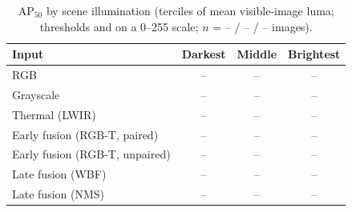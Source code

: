 \begin{table}[t]\centering\caption{AP$_{50}$ by scene illumination (terciles of mean visible-image luma; thresholds \LumLo{} and \LumHi{} on a 0--255 scale; $n$ = -- / -- / -- images).}\label{tab:illum}
\footnotesize
\begin{tabular}{@{}lccc@{}}\toprule
Input & Darkest & Middle & Brightest \\ \midrule
RGB & -- & -- & -- \\
Grayscale & -- & -- & -- \\
Thermal (LWIR) & -- & -- & -- \\
Early fusion (RGB-T, paired) & -- & -- & -- \\
Early fusion (RGB-T, unpaired) & -- & -- & -- \\
Late fusion (WBF) & -- & -- & -- \\
Late fusion (NMS) & -- & -- & -- \\
\bottomrule\end{tabular}
\end{table}
